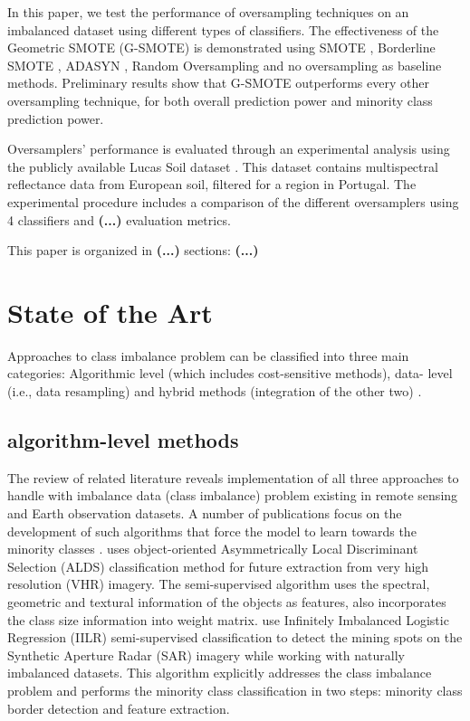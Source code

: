 \documentclass[parskip=full]{scrartcl}
\begin{document}
In this paper, we test the performance of oversampling techniques on an
imbalanced dataset using different types of classifiers. The effectiveness of
the Geometric SMOTE (G-SMOTE) \cite{Douzas2019} is demonstrated using SMOTE
\cite{Chawla2002}, Borderline SMOTE \cite{Han2005}, ADASYN \cite{HaiboHe2008},
Random Oversampling and no oversampling as baseline methods. Preliminary results
show that G-SMOTE outperforms every other oversampling technique, for both
overall prediction power and minority class prediction power.

Oversamplers' performance is evaluated through an experimental analysis using
the publicly available Lucas Soil dataset \cite{Toth2013}. This dataset contains
multispectral reflectance data from European soil, filtered for a region in
Portugal. The experimental procedure includes a comparison of the different
oversamplers using 4 classifiers and \textbf{(...)} evaluation metrics.

This paper is organized in \textbf{(...)} sections: \textbf{(...)}

\section{State of the Art}

Approaches to class imbalance problem can be classified into three main
categories: Algorithmic level (which includes cost-sensitive methods), data-
level (i.e., data resampling) and hybrid methods (integration of the other two)
\cite{Ji2018}.

\subsection{algorithm-level methods}
The review of related literature reveals implementation of all three approaches
to handle with imbalance data (class imbalance) problem existing in remote
sensing and Earth observation datasets. A number of publications focus on the
development of such algorithms that force the model to learn towards the
minority classes \cite{Wang2019, Chen2010, Williams2009, Ji2018}.
\cite{Chen2010} uses object-oriented Asymmetrically Local Discriminant
Selection (ALDS) classification method for future extraction from very high
resolution (VHR) imagery. The semi-supervised algorithm uses the spectral,
geometric and textural information of the objects as features, also
incorporates the class size information into weight matrix. \cite{Williams2009}
use Infinitely Imbalanced Logistic Regression (IILR) semi-supervised
classification to detect the mining spots on the Synthetic Aperture Radar (SAR)
imagery while working with naturally imbalanced datasets. This algorithm
explicitly addresses the class imbalance problem and performs the minority
class classification in two steps: minority class border detection and
feature extraction.
\end{document}
